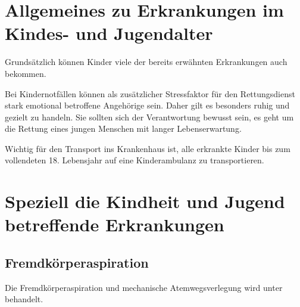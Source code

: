 \section{Allgemeines zu Erkrankungen im Kindes- und Jugendalter}

Grundsätzlich können Kinder viele der bereits erwähnten Erkrankungen auch bekommen. 

Bei Kindernotfällen können als zusätzlicher Stressfaktor für
den Rettungsdienst stark emotional betroffene Angehörige sein. Daher gilt es besonders ruhig und gezielt zu handeln. Sie sollten sich der Verantwortung bewusst sein, es geht um die Rettung eines jungen Menschen mit langer Lebenserwartung.

Wichtig für den Transport ins Krankenhaus ist, alle erkrankte
Kinder bis zum vollendeten 18. Lebensjahr auf eine
Kinderambulanz zu transportieren.


\section{Speziell die Kindheit und Jugend betreffende Erkrankungen}




\subsection{Fremdkörperaspiration}

Die Fremdkörperaspiration und mechanische Atemwegsverlegung wird unter
 behandelt.


